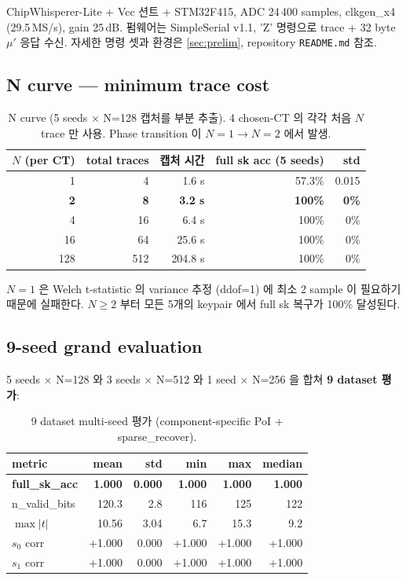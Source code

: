 \documentclass[11pt]{article}
\theoremstyle{plain}
\theoremstyle{definition}
\theoremstyle{remark}
\begin{document}
ChipWhisperer-Lite + Vcc 션트 + STM32F415, ADC 24\,400 samples,
clkgen\_x4 (29.5\,MS/s), gain 25\,dB. 펌웨어는 SimpleSerial v1.1, 'Z'
명령으로 trace + 32 byte $\mu'$ 응답 수신. 자세한 명령 셋과 환경은
\cref{sec:prelim}, repository \texttt{README.md} 참조.

\subsection{N curve — minimum trace cost}

\begin{table}[h!]
\centering
\caption{N curve (5 seeds × N=128 캡처를 부분 추출). 4 chosen-CT 의 각각
처음 $N$ trace 만 사용. Phase transition 이 $N=1 \to N=2$ 에서 발생.}
\label{tab:ncurve}
\small
\begin{tabular}{rrrrr}
\toprule
$N$ (per CT) & total traces & 캡처 시간 & full sk acc (5 seeds) & std \\
\midrule
1 & 4 & 1.6 s & 57.3\% & 0.015 \\
\textbf{2} & \textbf{8} & \textbf{3.2 s} & \textbf{100\%} & \textbf{0\%} \\
4 & 16 & 6.4 s & 100\% & 0\% \\
16 & 64 & 25.6 s & 100\% & 0\% \\
128 & 512 & 204.8 s & 100\% & 0\% \\
\bottomrule
\end{tabular}
\end{table}

$N=1$ 은 Welch t-statistic 의 variance 추정 (ddof=1) 에 최소 2 sample 이
필요하기 때문에 실패한다. $N \geq 2$ 부터 모든 5개의 keypair 에서 full sk
복구가 100\% 달성된다.

\subsection{9-seed grand evaluation}

5 seeds $\times$ N=128 와 3 seeds $\times$ N=512 와 1 seed $\times$ N=256 을
합쳐 \textbf{9 dataset 평가}:

\begin{table}[h!]
\centering
\caption{9 dataset multi-seed 평가 (component-specific PoI + sparse\_recover).}
\label{tab:9seed}
\small
\begin{tabular}{lrrrrr}
\toprule
metric & mean & std & min & max & median \\
\midrule
\textbf{full\_sk\_acc} & \textbf{1.000} & \textbf{0.000} & \textbf{1.000} & \textbf{1.000} & \textbf{1.000} \\
n\_valid\_bits & 120.3 & 2.8 & 116 & 125 & 122 \\
$\max|t|$ & 10.56 & 3.04 & 6.7 & 15.3 & 9.2 \\
$s_0$ corr & +1.000 & 0.000 & +1.000 & +1.000 & +1.000 \\
$s_1$ corr & +1.000 & 0.000 & +1.000 & +1.000 & +1.000 \\
\bottomrule
\end{tabular}
\end{table}
\end{document}

